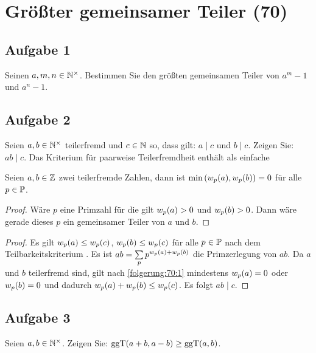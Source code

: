 \section{Größter gemeinsamer Teiler (70)}

\subsection{Aufgabe 1}
Seinen $a,m,n \in \mathbb{N}^\times$. Bestimmen Sie den größten gemeinsamen Teiler
von $a^m - 1$ und $a^n - 1$.

\subsection{Aufgabe 2}
Seien $a,b \in \mathbb{N}^\times$ teilerfremd und $c \in \mathbb{N}$ so,
dass gilt: $a \mid c$ und $b \mid c$. Zeigen Sie: $ab \mid c$.\bignewline
Das Kriterium für paarweise Teilerfremdheit \parencite[65]{book:zahlentheorie}
enthält als einfache
\begin{folgerung}
  \label{folgerung:70:1}
  Seien $a,b \in \mathbb{Z}$ zwei teilerfremde Zahlen, dann ist
  $\min{(w_p(a), w_p(b))} = 0$
  für alle $p \in \mathbb{P}$.
\end{folgerung}

\begin{proof}
  Wäre $p$ eine Primzahl für die gilt
  $w_p(a) > 0$ und $w_p(b) > 0$.
  Dann wäre gerade dieses $p$ ein gemeinsamer Teiler von $a$ und $b$.
\end{proof}

\begin{proof}
  Es gilt $w_p(a) \leq w_p(c)$,
  $w_p(b) \leq w_p(c)$ für alle $p \in \mathbb{P}$
  nach dem Teilbarkeitskriterium \mbox{\parencite[50]{book:zahlentheorie}}.
  Es ist $ab = \sum\limits_{p} p^{w_p(a) + w_p(b)}$
  die Primzerlegung von $ab$.
  Da $a$ und $b$ teilerfremd sind, gilt nach
  \autoref{folgerung:70:1} mindestens $w_p(a) = 0$ oder
  $w_p(b) = 0$ und dadurch $w_p(a) + w_p(b)
    \leq w_p(c)$. Es folgt $ab \mid c$.
\end{proof}

\subsection{Aufgabe 3}
Seien $a,b \in \mathbb{N}^\times$. Zeigen Sie: $\text{ggT}(a + b,a - b) \geq \text{ggT}(a,b)$.

